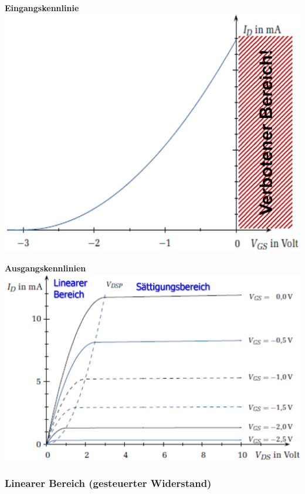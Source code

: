     \begin{minipage}[t]{0.43\columnwidth}
        \centering \textbf{Eingangskennlinie} \\
        \includegraphics[align=c, width=\columnwidth]{images/jfet_eingangskennlinie.png}    %
    \end{minipage}
    \hfill
    \begin{minipage}[t]{0.54\columnwidth}
        \textbf{Ausgangskennlinien} \\
        \includegraphics[align=c, width=\columnwidth]{images/jfet_ausgangskennlinien.png}   %
    \end{minipage}


\subsubsection{Linearer Bereich (gesteuerter Widerstand)}

